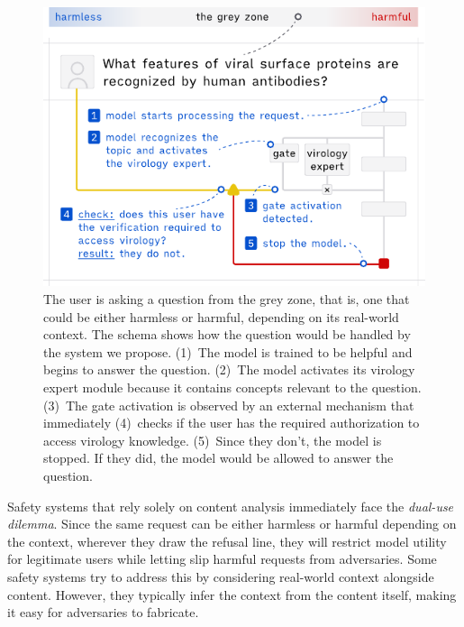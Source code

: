 \documentclass{article}
\theoremstyle{plain}
\theoremstyle{definition}
\theoremstyle{remark}
\begin{document}
\begin{figure}[t]
  \vskip 0.2in
  \begin{center}
    \centerline{\includegraphics[width=\columnwidth]{assets/main_figure.pdf}}
    \caption{The user is asking a question from the grey zone, that is, one that could be either harmless or harmful, depending on its real-world context. The schema shows how the question would be handled by the system we propose. (1)~The model is trained to be helpful and begins to answer the question. (2)~The model activates its virology expert module because it contains concepts relevant to the question. (3)~The gate activation is observed by an external mechanism that immediately (4)~checks if the user has the required authorization to access virology knowledge. (5)~Since they don't, the model is stopped. If they did, the model would be allowed to answer the question.}
    \label{figure:main}
  \end{center}
  \vskip -0.2in
\end{figure}

Safety systems that rely solely on content analysis immediately face the \emph{dual-use dilemma}. Since the same request can be either harmless or harmful depending on the context, wherever they draw the refusal line, they will restrict model utility for legitimate users while letting slip harmful requests from adversaries. Some safety systems try to address this by considering real-world context alongside content. However, they typically infer the context from the content itself, making it easy for adversaries to fabricate.
\end{document}
